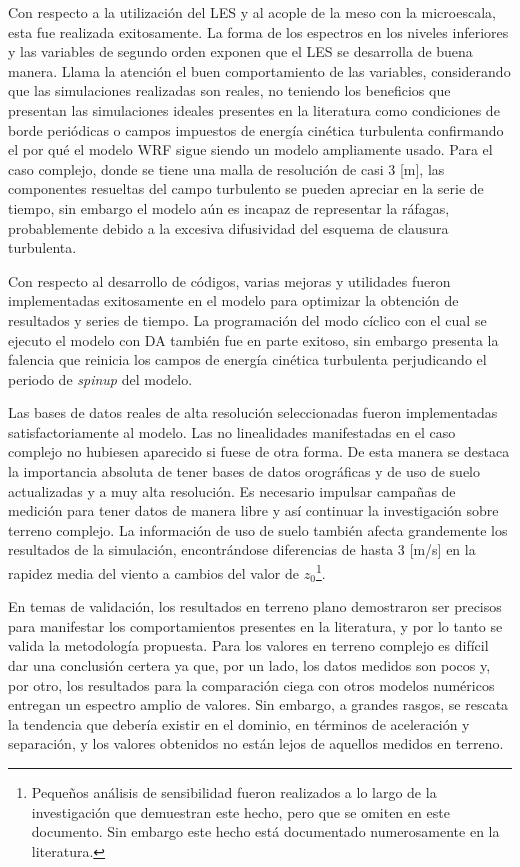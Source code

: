 \begin{itemize*}
	\item Con respecto a la utilización del LES y al acople de la meso con la microescala, esta fue realizada exitosamente. La forma de los espectros en los niveles inferiores y las variables de segundo orden exponen que el LES se desarrolla de buena manera. Llama la atención el buen comportamiento de las variables, considerando que las simulaciones realizadas son reales, no teniendo los beneficios que presentan las simulaciones ideales presentes en la literatura como condiciones de borde periódicas o campos impuestos de energía cinética turbulenta confirmando el por qué el modelo WRF sigue siendo un modelo ampliamente usado. Para el caso complejo, donde se tiene una malla de resolución de casi 3 [m], las componentes resueltas del campo turbulento se pueden apreciar en la serie de tiempo, sin embargo el modelo aún es incapaz de representar la ráfagas, probablemente debido a la excesiva difusividad del esquema de clausura turbulenta.
	\item Con respecto al desarrollo de códigos, varias mejoras y utilidades fueron implementadas exitosamente en el modelo para optimizar la obtención de resultados y series de tiempo. La programación del modo cíclico con el cual se ejecuto el modelo con DA también fue en parte exitoso, sin embargo presenta la falencia que reinicia los campos de energía cinética turbulenta perjudicando el periodo de \emph{spinup} del modelo.
	\item Las bases de datos reales de alta resolución seleccionadas fueron implementadas satisfactoriamente al modelo. Las no linealidades manifestadas en el caso complejo no hubiesen aparecido si fuese de otra forma. De esta manera se destaca la importancia absoluta de tener bases de datos orográficas y de uso de suelo actualizadas y a muy alta resolución. Es necesario impulsar campañas de medición para tener datos de manera libre y así continuar la investigación sobre terreno complejo. La información de uso de suelo también afecta grandemente los resultados de la simulación, encontrándose diferencias de hasta 3 [m/s] en la rapidez media del viento a cambios del valor de $z_0$\footnote{Pequeños análisis de sensibilidad fueron realizados a lo largo de la investigación que demuestran este hecho, pero que se omiten en este documento. Sin embargo este hecho está documentado numerosamente en la literatura.}.
	\item En temas de validación, los resultados en terreno plano demostraron ser precisos para manifestar los comportamientos presentes en la literatura, y por lo tanto se valida la metodología propuesta. Para los valores en terreno complejo es difícil dar una conclusión certera ya que, por un lado, los datos medidos son pocos y, por otro, los resultados para la comparación ciega con otros modelos numéricos entregan un espectro amplio de valores. Sin embargo, a grandes rasgos, se rescata la tendencia que debería existir en el dominio, en términos de aceleración y separación, y los valores obtenidos no están lejos de aquellos medidos en terreno.
\end{itemize*}

